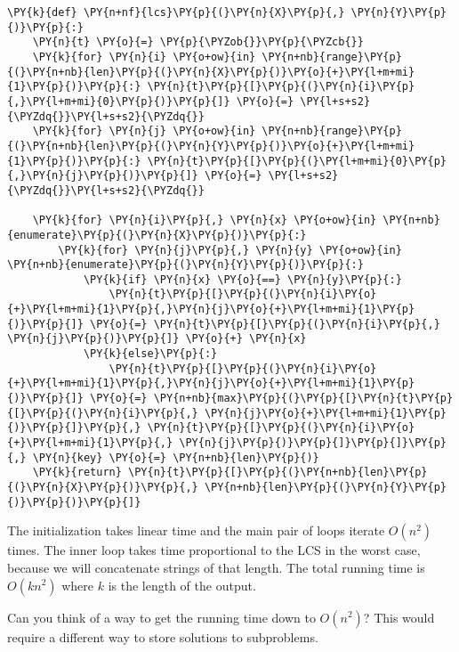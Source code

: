 \begin{Verbatim}[commandchars=\\\{\}]
\PY{k}{def} \PY{n+nf}{lcs}\PY{p}{(}\PY{n}{X}\PY{p}{,} \PY{n}{Y}\PY{p}{)}\PY{p}{:}
    \PY{n}{t} \PY{o}{=} \PY{p}{\PYZob{}}\PY{p}{\PYZcb{}}
    \PY{k}{for} \PY{n}{i} \PY{o+ow}{in} \PY{n+nb}{range}\PY{p}{(}\PY{n+nb}{len}\PY{p}{(}\PY{n}{X}\PY{p}{)}\PY{o}{+}\PY{l+m+mi}{1}\PY{p}{)}\PY{p}{:} \PY{n}{t}\PY{p}{[}\PY{p}{(}\PY{n}{i}\PY{p}{,}\PY{l+m+mi}{0}\PY{p}{)}\PY{p}{]} \PY{o}{=} \PY{l+s+s2}{\PYZdq{}}\PY{l+s+s2}{\PYZdq{}}
    \PY{k}{for} \PY{n}{j} \PY{o+ow}{in} \PY{n+nb}{range}\PY{p}{(}\PY{n+nb}{len}\PY{p}{(}\PY{n}{Y}\PY{p}{)}\PY{o}{+}\PY{l+m+mi}{1}\PY{p}{)}\PY{p}{:} \PY{n}{t}\PY{p}{[}\PY{p}{(}\PY{l+m+mi}{0}\PY{p}{,}\PY{n}{j}\PY{p}{)}\PY{p}{]} \PY{o}{=} \PY{l+s+s2}{\PYZdq{}}\PY{l+s+s2}{\PYZdq{}}

    \PY{k}{for} \PY{n}{i}\PY{p}{,} \PY{n}{x} \PY{o+ow}{in} \PY{n+nb}{enumerate}\PY{p}{(}\PY{n}{X}\PY{p}{)}\PY{p}{:}
        \PY{k}{for} \PY{n}{j}\PY{p}{,} \PY{n}{y} \PY{o+ow}{in} \PY{n+nb}{enumerate}\PY{p}{(}\PY{n}{Y}\PY{p}{)}\PY{p}{:}
            \PY{k}{if} \PY{n}{x} \PY{o}{==} \PY{n}{y}\PY{p}{:}
                \PY{n}{t}\PY{p}{[}\PY{p}{(}\PY{n}{i}\PY{o}{+}\PY{l+m+mi}{1}\PY{p}{,}\PY{n}{j}\PY{o}{+}\PY{l+m+mi}{1}\PY{p}{)}\PY{p}{]} \PY{o}{=} \PY{n}{t}\PY{p}{[}\PY{p}{(}\PY{n}{i}\PY{p}{,} \PY{n}{j}\PY{p}{)}\PY{p}{]} \PY{o}{+} \PY{n}{x}
            \PY{k}{else}\PY{p}{:}
                \PY{n}{t}\PY{p}{[}\PY{p}{(}\PY{n}{i}\PY{o}{+}\PY{l+m+mi}{1}\PY{p}{,}\PY{n}{j}\PY{o}{+}\PY{l+m+mi}{1}\PY{p}{)}\PY{p}{]} \PY{o}{=} \PY{n+nb}{max}\PY{p}{(}\PY{p}{[}\PY{n}{t}\PY{p}{[}\PY{p}{(}\PY{n}{i}\PY{p}{,} \PY{n}{j}\PY{o}{+}\PY{l+m+mi}{1}\PY{p}{)}\PY{p}{]}\PY{p}{,} \PY{n}{t}\PY{p}{[}\PY{p}{(}\PY{n}{i}\PY{o}{+}\PY{l+m+mi}{1}\PY{p}{,} \PY{n}{j}\PY{p}{)}\PY{p}{]}\PY{p}{]}\PY{p}{,} \PY{n}{key} \PY{o}{=} \PY{n+nb}{len}\PY{p}{)}
    \PY{k}{return} \PY{n}{t}\PY{p}{[}\PY{p}{(}\PY{n+nb}{len}\PY{p}{(}\PY{n}{X}\PY{p}{)}\PY{p}{,} \PY{n+nb}{len}\PY{p}{(}\PY{n}{Y}\PY{p}{)}\PY{p}{)}\PY{p}{]}
\end{Verbatim}



The initialization takes linear time and the main pair of loops iterate $O(n^2)$ times.
The inner loop takes time proportional to the LCS in the worst case, because we will concatenate strings of that length.
The total running time is $O(kn^2)$ where $k$ is the length of the output.


Can you think of a way to get the running time down to $O(n^2)$?
This would require a different way to store solutions to subproblems.
